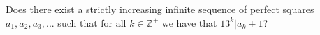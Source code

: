 Does there exist a strictly increasing infinite sequence of perfect squares $a_1, a_2, a_3, ...$ such that for all $k\in \mathbb{Z}^+$ we have that $13^k | a_k+1$?

